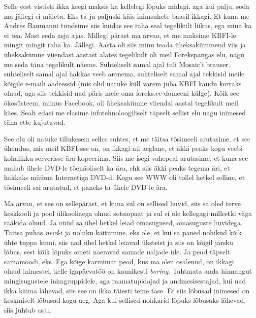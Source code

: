Selle eest vististi ikka keegi maksis ka kellelegi lõpuks midagi, aga kui 
palju, 
seda ma jällegi ei mäleta. Eks ta ju paljuski käis inimsuhete baasil ikkagi. Et 
kuna me Andres Baumanni tundsime siis kuidas see raha
seal tegelikult  liikus, ega mina ka ei tea. Mast seda asja 
ajas. Millegi pärast ma arvan, et  me maksime KBFI-le mingit mingit raha ka. 
Jällegi. Aasta oli siis minu teada üheksakümmend viis ja 
üheksakümne viiendast aastast alates tegelikult oli meil 
Forekspangas elu, nagu me seda täna tegelikult näeme. 
Suhteliselt samal ajal tuli Mosaic'i brauser, suhteliselt samal ajal hakkas veeb arenema, 
suhteliselt samal ajal tekkisid meile kõigile e-maili aadressid (mis olid 
natuke küll varem juba KBFI kaudu  korraks olnud, aga siis tekkisid nad päris 
meie oma foreks.ee domeeni külge). Kõik see ökosüsteem, miinus Facebook, oli 
üheksakümne viiendal aastal tegelikult meil käes. Sealt edasi me 
elasime infotehnoloogiliselt täpselt sellist elu nagu inimesed täna ette 
kujutavad. 

See elu oli natuke tillukesem selles suhtes, et me täitsa tõsimeeli arutasime, 
et see ühendus, mis meil KBFI-sse on, on ikkagi nii aeglane, et äkki peaks kogu 
veebi kohalikku serverisse ära kopeerima. Siis me isegi vahepeal arutasime, et 
kuna see mahub ühele DVD-le tõenäoliselt ka ära, ehk siis äkki peaks tegema 
äri, et hakkaks müüma Internetiga DVD-d. Kogu see WWW oli tollel hetkel 
selline, et tõsimeeli sai arutatud, et paneks ta ühele DVD-le ära. 


Ma arvan, et see on sellepärast, et kuna sul on sellised huvid, siis sa oled 
terve keskkooli ja pool ülikooliaega olnud sotsiopaat ja sul ei ole kellegagi 
millestki väga rääkida olnud. Ja nüüd sa ühel hetkel leiad omasugused, 
omasuguste huvidega. Täitsa puhas \emph{nerd}-i ja nohiku käitumine, eks ole, 
et 
kui sa paned  nohikud  kõik ühte tuppa kinni, siis nad ühel hetkel leiavad 
üksteist ja siis on kõigil järsku lõbus, sest kõik lõpuks ometi naeravad samade 
naljade üle. Ja peod täpselt samamoodi, eks. Ega kõige karmimat peod, kus ma 
olen  osalenud, on ikkagi olnud inimestel, kelle igapäevatöö on kaunikesti 
\emph{boring}. Tahtmata anda hinnangut mingisugustele inimgruppidele, aga   
raamatupidajad ja  andmesisestajad, kui nad ikka käima lähevad, siis see on 
ikka täiesti teine tase. Et siis lõbusad inimesed on keskmiselt lõbusad 
kogu aeg. Aga kui sellised nohkarid lõpuks lõbusaks lähevad, siis juhtub asju.

